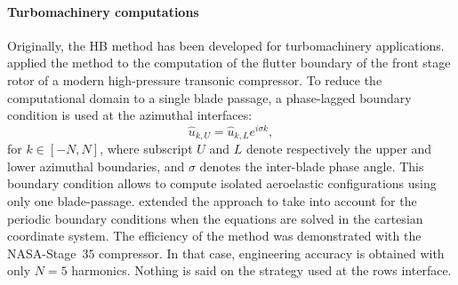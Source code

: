 \paragraph{Turbomachinery computations}
Originally, the HB method has been developed for 
turbomachinery applications.
\citet{Hall2002} applied the method to the computation
of the flutter boundary of the front stage rotor 
of a modern high-pressure transonic compressor. To reduce the
computational domain to a single blade passage, 
a phase-lagged boundary condition is used at the azimuthal
interfaces:
\begin{equation}
	\widehat{u}_{k, U} = \widehat{u}_{k, L} e^{i \sigma k},
\end{equation}
for $k \in [-N, N]$, where subscript $U$ and $L$ denote
respectively the upper and lower azimuthal boundaries, and
$\sigma$ denotes the inter-blade phase angle. This boundary
condition allows to compute isolated aeroelastic configurations
using only one blade-passage.
 extended the approach to take into account
for the periodic boundary conditions when the equations are solved in the
cartesian coordinate system. The efficiency of the
method was demonstrated with the NASA-Stage~$35$ compressor. In that case,
engineering accuracy is obtained with only $N=5$ harmonics.
Nothing is said on the strategy used at the rows interface.

